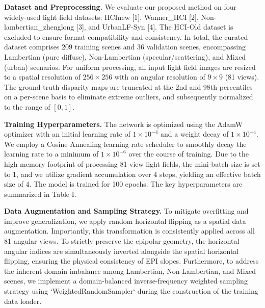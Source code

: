 \textbf{Dataset and Preprocessing.} 
We evaluate our proposed method on four widely-used light field datasets: HCInew [1], Wanner_HCI [2], Non-lambertian_zhenglong [3], and UrbanLF-Syn [4]. The HCI-Old dataset is excluded to ensure format compatibility and consistency. In total, the curated dataset comprises 209 training scenes and 36 validation scenes, encompassing Lambertian (pure diffuse), Non-Lambertian (specular/scattering), and Mixed (urban) scenarios. For uniform processing, all input light field images are resized to a spatial resolution of $256 \times 256$ with an angular resolution of $9 \times 9$ (81 views). The ground-truth disparity maps are truncated at the 2nd and 98th percentiles on a per-scene basis to eliminate extreme outliers, and subsequently normalized to the range of $[0, 1]$.

\textbf{Training Hyperparameters.} 
The network is optimized using the AdamW optimizer with an initial learning rate of $1 \times 10^{-4}$ and a weight decay of $1 \times 10^{-4}$. We employ a Cosine Annealing learning rate scheduler to smoothly decay the learning rate to a minimum of $1 \times 10^{-6}$ over the course of training. Due to the high memory footprint of processing 81-view light fields, the mini-batch size is set to 1, and we utilize gradient accumulation over 4 steps, yielding an effective batch size of 4. The model is trained for 100 epochs. The key hyperparameters are summarized in Table I.

\textbf{Data Augmentation and Sampling Strategy.} 
To mitigate overfitting and improve generalization, we apply random horizontal flipping as a spatial data augmentation. Importantly, this transformation is consistently applied across all 81 angular views. To strictly preserve the epipolar geometry, the horizontal angular indices are simultaneously inverted alongside the spatial horizontal flipping, ensuring the physical consistency of EPI slopes. Furthermore, to address the inherent domain imbalance among Lambertian, Non-Lambertian, and Mixed scenes, we implement a domain-balanced inverse-frequency weighted sampling strategy using `WeightedRandomSampler` during the construction of the training data loader.

